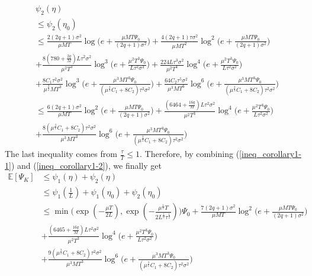 \documentclass[11pt]{article}
\begin{document}
\begin{align} \label{ineq_corollary1-2}
    &\psi_2(\eta) \nonumber\\
    &\leq \psi_2(\eta_0) \nonumber\\
    &\leq \frac{2(2q+1)\sigma^2}{\mu MT}\log\Big(e+\frac{\mu M T \Psi_0}{(2q+1)\sigma^2}\Big) + \frac{4(2q+1)\tau\sigma^2}{\mu MT^2} \log^2\Big(e+\frac{\mu M T \Psi_0}{(2q+1)\sigma^2}\Big) \nonumber\\
    &+ \frac{8(780+\frac{2q}{M})L\tau^2\sigma^2}{\mu^2 T^3} \log^3\Big(e+\frac{\mu^2 T^3\Psi_0}{L\tau^2\sigma^2}\Big) + \frac{224L\tau^3\sigma^2}{\mu^2 T^4}\log^4\Big(e+\frac{\mu^2 T^3\Psi_0}{L\tau^2\sigma^2}\Big) \nonumber\\
    &+ \frac{8C_1 \tau^2\sigma^2}{\mu^{\frac{3}{2}}MT^3}\log^3\Big(e+\frac{\mu^3 M T^3\Psi_0}{(\mu^{\frac{3}{2}}C_1+8C_2)\tau^2\sigma^2}\Big) + \frac{64C_2\tau^5\sigma^2}{\mu^3 MT^6} \log^6\Big(e+ \frac{\mu^3 M T^3\Psi_0}{(\mu^{\frac{3}{2}}C_1+8C_2)\tau^2\sigma^2}\Big) \nonumber\\
    &\leq \frac{6(2q+1)\sigma^2}{\mu MT}\log^2\Big(e+\frac{\mu M T \Psi_0}{(2q+1)\sigma^2}\Big) + \frac{(6464+\frac{16q}{M})L\tau^2\sigma^2}{\mu^2 T^3} \log^4\Big(e+\frac{\mu^2 T^3\Psi_0}{L\tau^2\sigma^2}\Big) \nonumber\\
    &+ \frac{8(\mu^{\frac{3}{2}}C_1+8C_2)\tau^2\sigma^2}{\mu^3 M T^3} \log^6 \Big(e + \frac{\mu^3 M T^3\Psi_0}{(\mu^{\frac{3}{2}}C_1+8C_2)\tau^2\sigma^2}\Big)
\end{align}
The last inequality comes from $\frac{\tau}{T} \leq 1$. Therefore, by combining (\ref{ineq_corollary1-1}) and (\ref{ineq_corollary1-2}), we finally get
\begin{align*}
    \mathbb{E}[\Psi_K] &\leq \psi_1(\eta) + \psi_2(\eta) \\
    &\leq \psi_1(\frac{1}{L}) + \psi_1(\eta_0) + \psi_2(\eta_0) \\
    &\leq \min \Big( \exp(-\frac{\mu T}{2L}), \exp(-\frac{\mu^{\frac{1}{2}}T}{2 L^{\frac{1}{2}}\tau^{\frac{1}{2}}})\Big) \Psi_0 + \frac{7(2q+1)\sigma^2}{\mu MT} \log^2 \Big(e+\frac{\mu M T \Psi_0}{(2q+1)\sigma^2}\Big) \\
        &+ \frac{(6465+\frac{16q}{M})L\tau^2\sigma^2}{\mu^2 T^3}\log^4 \Big(e+ \frac{\mu^2 T^3\Psi_0}{L\tau^2\sigma^2}\Big) \\
        &+ \frac{9(\mu^{\frac{3}{2}}C_1+8C_2)\tau^2\sigma^2}{\mu^3 M T^3} \log^6 \Big(e + \frac{\mu^3 M T^3\Psi_0}{(\mu^{\frac{3}{2}}C_1+8C_2)\tau^2\sigma^2}\Big)
\end{align*}
\end{document}
